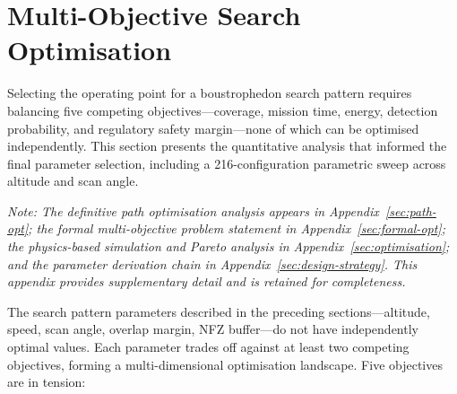%

\section{Multi-Objective Search Optimisation}\label{sec:search-opt}

Selecting the operating point for a boustrophedon search pattern requires balancing five competing objectives---coverage, mission time, energy, detection probability, and regulatory safety margin---none of which can be optimised independently.  This section presents the quantitative analysis that informed the final parameter selection, including a 216-configuration parametric sweep across altitude and scan angle.

\medskip\noindent\textit{Note: The definitive path optimisation analysis appears in Appendix~\ref{sec:path-opt}; the formal multi-objective problem statement in Appendix~\ref{sec:formal-opt}; the physics-based simulation and Pareto analysis in Appendix~\ref{sec:optimisation}; and the parameter derivation chain in Appendix~\ref{sec:design-strategy}.  This appendix provides supplementary detail and is retained for completeness.}

\medskip
The search pattern parameters described in the preceding sections---altitude, speed, scan angle, overlap margin, NFZ buffer---do not have independently optimal values. Each parameter trades off against at least two competing objectives, forming a multi-dimensional optimisation landscape. Five objectives are in tension:

